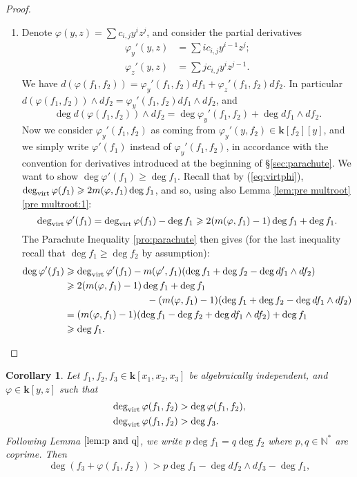 \documentclass[reqno,oneside,11pt]{amsart}
\theoremstyle{plain}
\newtheorem{corollary}[theorem]{Corollary}
\theoremstyle{definition}
\newcommand{\N}{\mathbb{N}}
\newcommand{\K}{\mathbf{k}}
\renewcommand{\phi}{\varphi}
\newcommand{\dvirt}{\deg_{\text{\rm virt}}}
\renewcommand{\ge}{\geqslant}
\begin{document}
\begin{proof}
\begin{enumerate}[wide]
\item Denote $\phi(y,z) = \sum c_{i,j}y^i z^j$, and consider the partial derivatives
\begin{align*}
\phi_y'(y,z) &= \sum i c_{i,j} y^{i-1}z^j; \\
\phi_z'(y,z) &= \sum j c_{i,j} y^{i}z^{j-1}.
\end{align*}
We have $d (\phi(f_1,f_2)) = \phi_y'(f_1,f_2) df_1 + \phi_z'(f_1,f_2) df_2$.
In particular $d (\phi(f_1,f_2)) \wedge df_2 =  \phi_y'(f_1,f_2) df_1 \wedge
df_2$, and
$$\deg d (\phi(f_1,f_2)) \wedge df_2 = \deg \phi_y'(f_1,f_2) + \deg df_1 \wedge
df_2.$$
Now we consider $\phi_y'(f_1,f_2)$ as coming from $\phi_y'(y,f_2) \in
\K[f_2][y]$, and we simply write $\phi'(f_1)$ instead of $\phi_y'(f_1,f_2)$, in
accordance with the convention for derivatives introduced at the beginning of
\S\ref{sec:parachute}.
We want to show $ \deg \phi'(f_1) \ge \deg f_1$.
Recall that by (\ref{eq:virtphi}), $\dvirt \phi(f_1) \ge 2 m(\phi,f_1)\deg f_1$,
and so, using also Lemma \ref{lem:pre multroot}\ref{pre multroot:1}:
$$\dvirt \phi'(f_1) = \dvirt \phi(f_1) - \deg f_1 \ge 2 (m(\phi,f_1) - 1)\deg f_1 + \deg f_1.$$
The Parachute Inequality \ref{pro:parachute} then gives (for the last
inequality recall that $\deg f_1 \ge \deg f_2$ by assumption):
\begin{align*}
\deg \phi'(f_1) &\ge \dvirt \phi'(f_1) - m(\phi',f_1)(\deg f_1 + \deg f_2 -\deg df_1\wedge df_2) \\
 &\ge  2(m(\phi,f_1) - 1)\deg f_1 + \deg f_1 \\
 & \hspace{3cm} - (m(\phi,f_1) - 1)(\deg f_1 + \deg f_2 -\deg df_1\wedge df_2) \\
 &= (m(\phi,f_1) - 1)(\deg f_1 - \deg f_2 +\deg df_1\wedge df_2) + \deg f_1\\
 &\ge \deg f_1 .\qedhere
\end{align*}
\end{enumerate}
\end{proof}

\begin{corollary}\label{cor:parachute h + phi}
Let $f_1,f_2,f_3 \in \K[x_1,x_2,x_3]$ be algebraically independent, and $\phi \in \K[y,z]$ such that
\begin{align*}
\dvirt \phi(f_1,f_2) &> \deg \phi(f_1,f_2),\\
\dvirt \phi(f_1,f_2) &> \deg f_3.
\end{align*}
Following Lemma $\ref{lem:p and q}$, we write $p \deg f_1 = q \deg f_2$ where $p,q \in \N^*$ are coprime.
Then
$$\deg (f_3 + \phi(f_1,f_2))  > p \deg f_1  - \deg df_2\wedge df_3 - \deg f_1,$$
\end{corollary}
\end{document}
